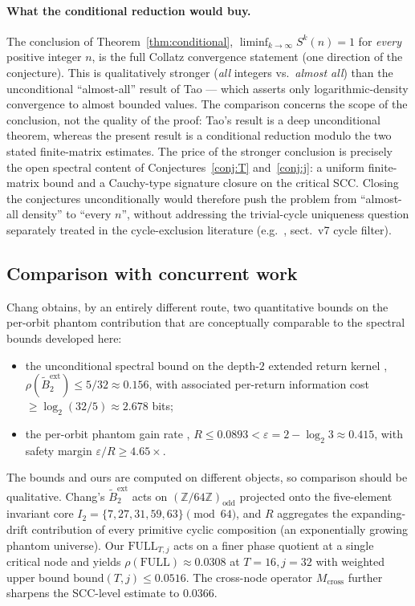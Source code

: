 \documentclass[11pt,a4paper]{article}
\theoremstyle{definition}
\newcommand{\Z}{\mathbb{Z}}
\newcommand{\full}{\mathrm{FULL}}
\newcommand{\spec}{\rho}
\begin{document}
\paragraph{What the conditional reduction would buy.}
The conclusion of Theorem~\ref{thm:conditional},
$\liminf_{k\to\infty} S^k(n) = 1$ for \emph{every} positive
integer $n$, is the full Collatz convergence statement (one
direction of the conjecture). This is qualitatively stronger
(\emph{all} integers vs.\ \emph{almost all}) than the
unconditional ``almost-all'' result of Tao
\cite{tao2019} --- which asserts only logarithmic-density
convergence to almost bounded values. The comparison concerns
the scope of the conclusion, not the quality of the proof: Tao's
result is a deep unconditional theorem, whereas the present
result is a conditional reduction modulo the two stated
finite-matrix estimates. The price of the stronger conclusion is
precisely the open spectral content of
Conjectures~\ref{conj:T} and~\ref{conj:j}: a uniform finite-matrix
bound and a Cauchy-type signature closure on the critical SCC.
Closing the conjectures unconditionally would therefore push the
problem from ``almost-all density'' to ``every $n$'', without
addressing the trivial-cycle uniqueness question separately
treated in the cycle-exclusion literature
(e.g.\ \cite{chang2026}, sect.~v7 cycle filter).

\subsection{Comparison with concurrent work}
\label{sec:comparison}

Chang \cite{chang2026} obtains, by an entirely different route, two
quantitative bounds on the per-orbit phantom contribution that are
conceptually comparable to the spectral bounds developed here:
\begin{itemize}
  \item the unconditional spectral bound on the depth-$2$ extended
        return kernel \cite[Theorem~C.3]{chang2026},
        $\spec(\widetilde{B}_2^{\mathrm{ext}}) \le 5/32 \approx 0.156$,
        with associated per-return information cost
        $\ge \log_2(32/5) \approx 2.678$ bits;
  \item the per-orbit phantom gain rate
        \cite[Theorem~7.19]{chang2026},
        $R \le 0.0893 < \varepsilon = 2 - \log_2 3 \approx 0.415$,
        with safety margin $\varepsilon / R \ge 4.65\times$.
\end{itemize}
The bounds and ours are computed on different objects, so
comparison should be qualitative. Chang's $\widetilde{B}_2^{\mathrm{ext}}$
acts on $(\Z/64\Z)_{\mathrm{odd}}$ projected onto the
five-element invariant core $I_2 = \{7, 27, 31, 59, 63\} \pmod{64}$,
and $R$ aggregates the expanding-drift contribution of every
primitive cyclic composition (an exponentially growing phantom
universe). Our $\full_{T,j}$ acts on a finer phase quotient at a
single critical node and yields
$\spec(\full) \approx 0.0308$ at $T = 16, j = 32$ with weighted
upper bound $\mathrm{bound}(T,j) \le 0.0516$. The cross-node
operator $M_{\mathrm{cross}}$ further sharpens the SCC-level
estimate to $0.0366$.
\end{document}

